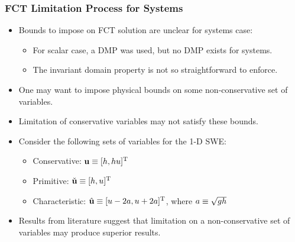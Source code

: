 \begin{frame}
\frametitle{FCT Limitation Process for Systems}

\begin{itemize}
  \item Bounds to impose on FCT solution are unclear for systems case:
    \begin{itemize}
      \item For scalar case, a DMP was used, but no DMP exists for systems.
      \item The invariant domain property is not so straightforward to enforce.
    \end{itemize}
  \item One may want to impose physical bounds on some non-conservative
    set of variables.
  \item Limitation of conservative variables may not satisfy these bounds.
  \item Consider the following sets of variables for the 1-D SWE:
    \begin{itemize}
      \item \textcolor{secondarycolorheavy}{Conservative}:
        $\mathbf{u} \equiv [h,hu]^{\text{T}}$
      \item \textcolor{secondarycolorheavy}{Primitive}:
        $\check{\mathbf{u}} \equiv [h,u]^{\text{T}}$
      \item \textcolor{secondarycolorheavy}{Characteristic}:
        $\hat{\mathbf{u}} \equiv [u-2a,
          u+2a]^{\text{T}}$,
          where $a\equiv\sqrt{gh}$
    \end{itemize}
  \item Results from literature suggest that limitation on a non-conservative
    set of variables may produce superior results.
\end{itemize}

\end{frame}
